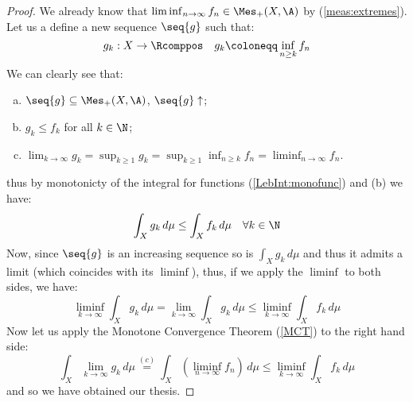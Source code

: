 \begin{proof}
    We already know that $\liminf_{n\to\infty} f_n \in \Mes_+(X,\A)$ by (\ref{meas:extremes}).\\
    Let us a define a new sequence $\seq{g}$ such that:
    \[
        g_k: X \to \Rcomppos \quad g_k \coloneqq \inf_{n\geq k} f_n    
    \]
    We can clearly see that:
    \begin{enumerate}[a)]
        \item $\seq{g} \subseteq \Mes_+(X,\A)$, $\seq{g} \uparrow$;
        \item $g_k \leq f_k$ for all $k\in\N$;
        \item $\lim_{k\to\infty} g_k = \sup_{k\geq 1} g_k = \sup_{k\geq 1} \inf_{n\geq k} f_n = \liminf_{n\to\infty} f_n$.
    \end{enumerate}
    thus by monotonicty of the integral for functions (\ref{LebInt:monofunc}) and (b) we have:
    \[
        \int_X g_k \, d\mu \leq \int_X  f_k \, d\mu \quad \forall k\in\N   
    \]
    Now, since $\seq{g}$ is an increasing sequence so is $\int_X g_k \, d\mu$ and thus it admits a limit (which coincides with its $\liminf$), thus, if we apply the $\liminf$ to both sides, we have:
    \[
        \liminf_{k\to\infty} \int_X g_k \, d\mu = \lim_{k\to\infty} \int_X  g_k \, d\mu \leq \liminf_{k\to\infty} \int_X f_k \, d\mu 
    \]
    Now let us apply the Monotone Convergence Theorem (\ref{MCT}) to the right hand side:
    \[
        \int_X \lim_{k\to\infty} g_k \, d\mu \overset{(c)}{=} \int_X \left( \liminf_{n\to\infty} f_n \right) \, d\mu \leq \liminf_{k\to\infty} \int_X f_k \, d\mu
    \]
    and so we have obtained our thesis.
\end{proof}
